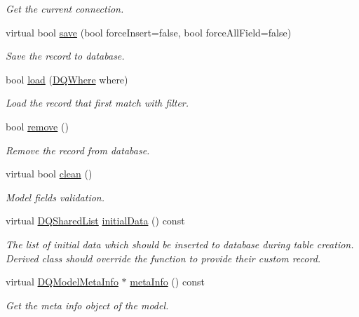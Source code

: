 \begin{DoxyCompactItemize}
\begin{DoxyCompactList}\small\item\em Get the current connection. \item\end{DoxyCompactList}\item 
virtual bool \hyperlink{classDQModel_a6807b1e090625800c949662485fd4fea}{save} (bool forceInsert=false, bool forceAllField=false)
\begin{DoxyCompactList}\small\item\em Save the record to database. \item\end{DoxyCompactList}\item 
\hypertarget{classDQModel_a73e051b5a4c29270223f6386115f072d}{
bool \hyperlink{classDQModel_a73e051b5a4c29270223f6386115f072d}{load} (\hyperlink{classDQWhere}{DQWhere} where)}
\label{classDQModel_a73e051b5a4c29270223f6386115f072d}

\begin{DoxyCompactList}\small\item\em Load the record that first match with filter. \item\end{DoxyCompactList}\item 
bool \hyperlink{classDQModel_a310ed15d9b677f9ca81947b6235ab1cf}{remove} ()
\begin{DoxyCompactList}\small\item\em Remove the record from database. \item\end{DoxyCompactList}\item 
virtual bool \hyperlink{classDQModel_a13283b3db16c67abfff71aac8811464d}{clean} ()
\begin{DoxyCompactList}\small\item\em Model fields validation. \item\end{DoxyCompactList}\item 
virtual \hyperlink{classDQSharedList}{DQSharedList} \hyperlink{classDQModel_a2aa1bf4015bd056e11e96994d782be56}{initialData} () const 
\begin{DoxyCompactList}\small\item\em The list of initial data which should be inserted to database during table creation. Derived class should override the function to provide their custom record. \item\end{DoxyCompactList}\item 
\hypertarget{classDQAbstractModel_ab03df8f9993c3fc76f41b0d40eacfa41}{
virtual \hyperlink{classDQModelMetaInfo}{DQModelMetaInfo} $\ast$ \hyperlink{classDQAbstractModel_ab03df8f9993c3fc76f41b0d40eacfa41}{metaInfo} () const }
\label{classDQAbstractModel_ab03df8f9993c3fc76f41b0d40eacfa41}

\begin{DoxyCompactList}\small\item\em Get the meta info object of the model. \item\end{DoxyCompactList}\end{DoxyCompactItemize}
